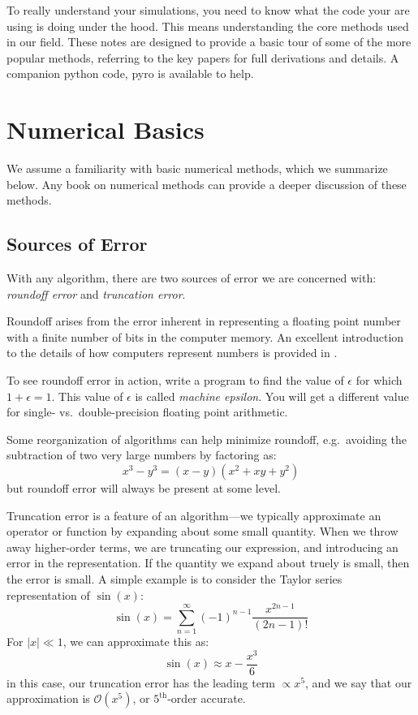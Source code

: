To really understand your simulations, you need to know what the code
your are using is doing under the hood.  This means understanding the 
core methods used in our field.  These notes are designed to provide
a basic tour of some of the more popular methods, referring to the 
key papers for full derivations and details.  A companion python code,
{\sf pyro} is available to help. 


\section{Numerical Basics}

We assume a familiarity with basic numerical methods, which we
summarize below.  Any book on numerical methods can provide a
deeper discussion of these methods.

\subsection{Sources of Error}

With any algorithm, there are two sources of error we are concerned
with: {\em roundoff error} and {\em truncation error}.  

Roundoff arises from the error inherent in representing a floating
point number with a finite number of bits in the computer memory.  An
excellent introduction to the details of how computers represent
numbers is provided in \cite{goldberg:1991}.  

\begin{exercise}
To see roundoff error in action, write a program to find the value
of $\epsilon$ for which $1 + \epsilon = 1$.  This value of $\epsilon$
is called {\em machine epsilon}.  You will get a different value for
single- vs.\ double-precision floating point arithmetic.
\end{exercise}

Some reorganization of algorithms can help minimize roundoff,
e.g.\ avoiding the subtraction of two very large numbers by factoring as:
\begin{equation}
x^3 - y^3 = (x - y)(x^2 + xy + y^2)
\end{equation}
but roundoff error will always be present at some level.

Truncation error is a feature of an algorithm---we typically
approximate an operator or function by expanding about some small
quantity.  When we throw away higher-order terms, we are truncating
our expression, and introducing an error in the representation.  If
the quantity we expand about truely is small, then the error is small.
A simple example is to consider the Taylor series representation of
$\sin(x)$:
\begin{equation}
\sin(x) = \sum_{n=1}^\infty (-1)^{n-1} \frac{x^{2n-1}}{(2n-1)!} 
\end{equation}
For $|x| \ll 1$, we can approximate this as:
\begin{equation}
\sin(x) \approx x - \frac{x^3}{6}
\end{equation}
in this case, our truncation error has the leading term $\propto x^5$,
and we say that our approximation is $\mathcal{O}(x^5)$, or
$5^\mathrm{th}$-order accurate.


